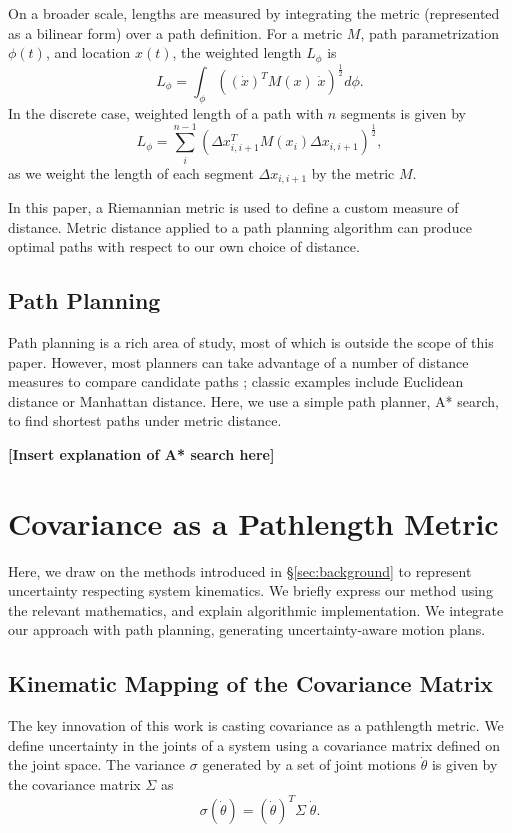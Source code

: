 \documentclass[10pt,conference]{ieeeconf}
\begin{document}
On a broader scale, lengths are measured by integrating the metric (represented as a bilinear form) over a path definition.
For a metric $M$, path parametrization $\phi(t)$, and location $x(t)$, the weighted length $L_\phi$ is
\begin{equation}\label{eqn:length}
    L_\phi = \int_\phi \left((\dot{x})^T M(x)\;\dot{x}\right)^\frac{1}{2} d\phi.
\end{equation}
In the discrete case, weighted length of a path with $n$ segments is given by
\begin{equation}
    L_\phi = \sum_i^{n-1} \left(\Delta x_{i, i+1}^T M(x_i) \Delta x_{i, i+1}\right)^\frac{1}{2},
\end{equation}
as we weight the length of each segment $\Delta x_{i,i+1}$ by the metric $M$.

In this paper, a Riemannian metric is used to define a custom measure of distance.
Metric distance applied to a path planning algorithm can produce optimal paths with respect to our own choice of distance.

\subsection{Path Planning}
Path planning is a rich area of study, most of which is outside the scope of this paper.
However, most planners can take advantage of a number of distance measures to compare candidate paths \cite{something?}; classic examples include Euclidean distance or Manhattan distance.
Here, we use a simple path planner, A* search, to find shortest paths under metric distance.

\noindent\textbf{[Insert explanation of A* search here]}

\section{Covariance as a Pathlength Metric}\label{sec:methods}
Here, we draw on the methods introduced in \S\ref{sec:background} to represent uncertainty respecting system kinematics.
We briefly express our method using the relevant mathematics, and explain algorithmic implementation.
We integrate our approach with path planning, generating uncertainty-aware motion plans.

\subsection{Kinematic Mapping of the Covariance Matrix}
The key innovation of this work is casting covariance as a pathlength metric.
We define uncertainty in the joints of a system using a covariance matrix defined on the joint space.
The variance $\sigma$ generated by a set of joint motions $\dot{\theta}$ is given by the covariance matrix $\Sigma$ as
\begin{equation}
    \sigma(\dot{\theta}) = (\dot{\theta})^T \Sigma \; \dot{\theta}.
\end{equation}
\end{document}

